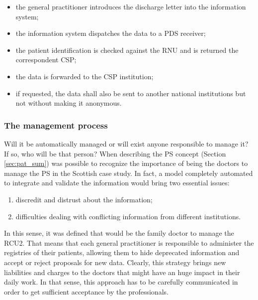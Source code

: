 \begin{itemize}
\item the general practitioner introduces the discharge letter into the information system;
\item the information system dispatches the data to a PDS receiver;
\item the patient identification is checked against the RNU and is returned the correspondent CSP;
\item the data is forwarded to the CSP institution;
\item if requested, the data shall also be sent to another national institutions but not without making it anonymous.
\end{itemize}



\subsubsection{The management process}

Will it be automatically managed or will exist anyone responsible to manage it? If so, who will be that person? When describing the PS concept (Section \ref{sec:pat_sum}) was possible to recognize the importance of being the doctors to manage the PS in the Scottish case study. In fact, a model completely automated to integrate and validate the information would bring two essential issues:
\begin{enumerate}
\item discredit and distrust about the information;
\item difficulties dealing with conflicting information from different institutions.
\end{enumerate}

In this sense, it was defined that would be the family doctor to manage the RCU2. That means that each general practitioner is responsible to administer the registries of their patients, allowing them to hide deprecated information and accept or reject proposals for new data. Clearly, this strategy brings new liabilities and charges to the doctors that might have an huge impact in their daily work. In that sense, this approach has to be carefully communicated in order to get sufficient acceptance by the professionals.







